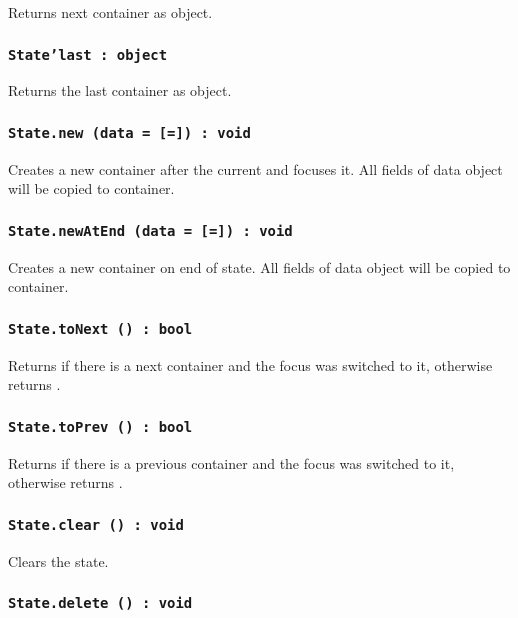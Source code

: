 Returns next container as object.

\subsubsection{\texttt{State'last : object}}

Returns the last container as object.

\subsubsection{\texttt{State.new (data = [=]) : void}}

Creates a new container after the current and focuses it. All fields of data object will be copied to container.

\subsubsection{\texttt{State.newAtEnd (data = [=]) : void}}

Creates a new container on end of state. All fields of data object will be copied to container.

\subsubsection{\texttt{State.toNext () : bool}}

Returns \true{} if there is a next container and the focus was switched to it, otherwise returns \false.

\subsubsection{\texttt{State.toPrev () : bool}}

Returns \true{} if there is a previous container and the focus was switched to it, otherwise returns \false.

\subsubsection{\texttt{State.clear () : void}}

Clears the state.

\subsubsection{\texttt{State.delete () : void}}

